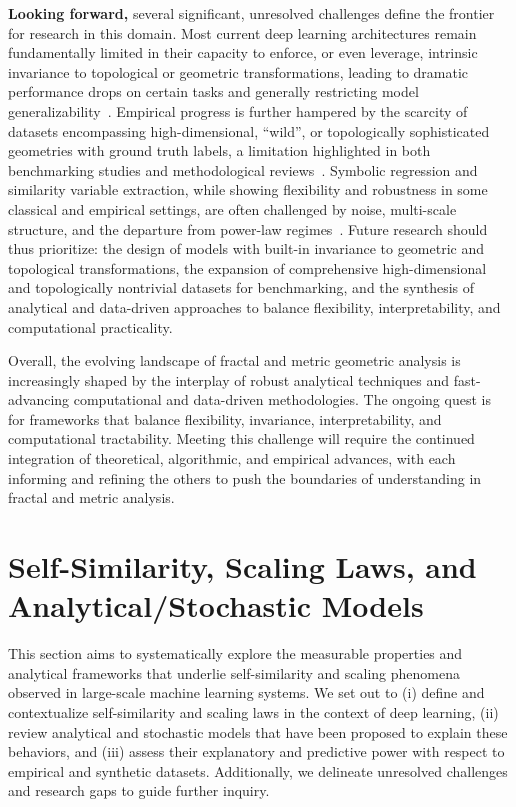 \documentclass[sigconf]{acmart}
\begin{document}
\textbf{Looking forward,} several significant, unresolved challenges define the frontier for research in this domain. Most current deep learning architectures remain fundamentally limited in their capacity to enforce, or even leverage, intrinsic invariance to topological or geometric transformations, leading to dramatic performance drops on certain tasks and generally restricting model generalizability~\cite{ref26,ref39}. Empirical progress is further hampered by the scarcity of datasets encompassing high-dimensional, ``wild'', or topologically sophisticated geometries with ground truth labels, a limitation highlighted in both benchmarking studies and methodological reviews~\cite{ref26,ref39}. Symbolic regression and similarity variable extraction, while showing flexibility and robustness in some classical and empirical settings, are often challenged by noise, multi-scale structure, and the departure from power-law regimes~\cite{ref65}. Future research should thus prioritize: the design of models with built-in invariance to geometric and topological transformations, the expansion of comprehensive high-dimensional and topologically nontrivial datasets for benchmarking, and the synthesis of analytical and data-driven approaches to balance flexibility, interpretability, and computational practicality.

Overall, the evolving landscape of fractal and metric geometric analysis is increasingly shaped by the interplay of robust analytical techniques and fast-advancing computational and data-driven methodologies. The ongoing quest is for frameworks that balance flexibility, invariance, interpretability, and computational tractability. Meeting this challenge will require the continued integration of theoretical, algorithmic, and empirical advances, with each informing and refining the others to push the boundaries of understanding in fractal and metric analysis.

\section{Self-Similarity, Scaling Laws, and Analytical/Stochastic Models}

This section aims to systematically explore the measurable properties and analytical frameworks that underlie self-similarity and scaling phenomena observed in large-scale machine learning systems. We set out to (i) define and contextualize self-similarity and scaling laws in the context of deep learning, (ii) review analytical and stochastic models that have been proposed to explain these behaviors, and (iii) assess their explanatory and predictive power with respect to empirical and synthetic datasets. Additionally, we delineate unresolved challenges and research gaps to guide further inquiry.
\end{document}
